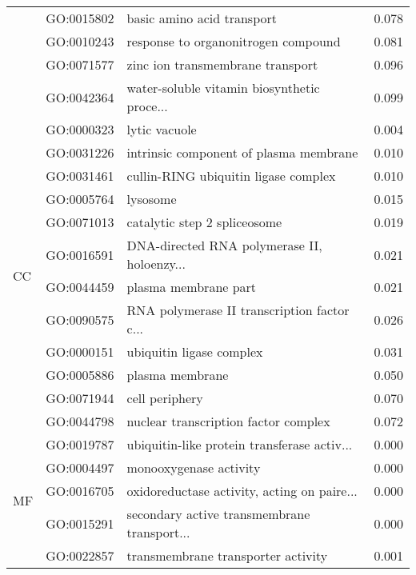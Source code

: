 \begin{longtable}{lllr}
   & GO:0015802 &                   basic amino acid transport &         0.078 \\
   & GO:0010243 &          response to organonitrogen compound &         0.081 \\
   & GO:0071577 &             zinc ion transmembrane transport &         0.096 \\
   & GO:0042364 &  water-soluble vitamin biosynthetic proce... &         0.099 \\
\cline{1-4}
\multirow{12}{*}{CC} & GO:0000323 &                                lytic vacuole &         0.004 \\
   & GO:0031226 &       intrinsic component of plasma membrane &         0.010 \\
   & GO:0031461 &         cullin-RING ubiquitin ligase complex &         0.010 \\
   & GO:0005764 &                                     lysosome &         0.015 \\
   & GO:0071013 &                 catalytic step 2 spliceosome &         0.019 \\
   & GO:0016591 &  DNA-directed RNA polymerase II, holoenzy... &         0.021 \\
   & GO:0044459 &                         plasma membrane part &         0.021 \\
   & GO:0090575 &  RNA polymerase II transcription factor c... &         0.026 \\
   & GO:0000151 &                     ubiquitin ligase complex &         0.031 \\
   & GO:0005886 &                              plasma membrane &         0.050 \\
   & GO:0071944 &                               cell periphery &         0.070 \\
   & GO:0044798 &         nuclear transcription factor complex &         0.072 \\
\cline{1-4}
\multirow{70}{*}{MF} & GO:0019787 &  ubiquitin-like protein transferase activ... &         0.000 \\
   & GO:0004497 &                       monooxygenase activity &         0.000 \\
   & GO:0016705 &  oxidoreductase activity, acting on paire... &         0.000 \\
   & GO:0015291 &  secondary active transmembrane transport... &         0.000 \\
   & GO:0022857 &           transmembrane transporter activity &         0.001 \\

\end{longtable}
